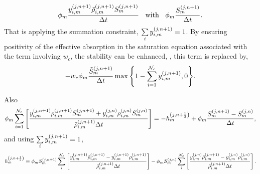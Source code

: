 \begin{displaymath}
    \phi_m  \frc{ \mfr[y]{i,m}{j, n+1}\mfr[\tilde{\rho}]{i,m}{j, n+1}\mfr[S]{m}{j,n+1}}{\Delta t}\;\; \text{ with }\;\;  \phi_{m}\frc{\mfr[S]{m}{j,n+1}}{\Delta t}.
\end{displaymath}
That is applying the summation constraint, $\summation_{i} \mfr[y]{i,m}{j, n+1}=1$. By ensuring positivity of the effective absorption in the saturation equation associated with the term involving $w_c$, the stability can be enhanced, \ie, this term is replaced by,
\begin{displaymath}
-w_c \phi_m\frc{\mfr[\tilde{S}]{m}{j, n+1}}{\Delta t} \max{\left\{ 1 - \summation_{i=1}^{\mathcal{N}_c} \mfr[y]{i,m}{j, n+1}, 0 \right\}}  . 
\end{displaymath} 

Also
\begin{equation}
    \phi_m \summation_{i=1}^{{\cal N}_c} \left[\frc{ \mfr[y]{i,m}{j,n+1} \mfr[\rho]{i,m}{j, n+1} \mfr[S]{m}{j, n+1} + \mfr[y]{i,m}{j,n} \mfr[\rho]{i,m}{j, n} \mfr[S]{m}{j, n}}{\mfr[\tilde{\rho}]{i,m}{j,n+1}\Delta t} \right] = -\mfr[h]{m}{j,n+\frac{1}{2}} + \phi_{m} \frc{\mfr[S]{m}{j,n+1}-\mfr[S]{m}{j,n}}{\Delta t},
\end{equation}
and using $\summation_{i}\mfr[y]{i,m}{j,n+1}=1$,
\begin{equation}
     \mfr[h]{m}{j, n+\frac{1}{2}} = \phi_{m} \mfr[S]{m}{j,n+1} \summation_{i}^{\mathcal{N}_{c}} \left[\frc{ \mfr[y]{i,m}{j,n+1} \mfr[\tilde{\rho}]{i,m}{j,n+1} - \mfr[y]{i,m}{j,n+1} \mfr[\rho]{i,m}{j,n+1}}{ \mfr[\tilde{\rho}]{i,m}{j,n+1}\Delta t}\right] - \phi_{m} \mfr[S]{m}{j,n} \summation_{i}^{\mathcal{N}_{c}} \left[\frc{ \mfr[y]{i,m}{j,n} \mfr[\tilde{\rho}]{i,m}{j,n+1} - \mfr[y]{i,m}{j,n} \mfr[\rho]{i,m}{j,n}}{ \mfr[\tilde{\rho}]{i,m}{j,n+1}\Delta t}\right].
\end{equation}

